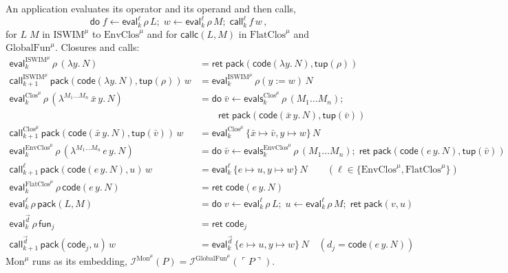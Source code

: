 \documentclass[10pt]{article}
\theoremstyle{acmplain}
\newcommand{\key}[1]{\mathsf{#1}}
\newcommand{\lam}[1]{\lambda #1.\,}
\newcommand{\clos}[2]{\lambda^{#1}\, #2.\,}
\newcommand{\funref}[1]{\key{fun}_{#1}}
\newcommand{\ext}[3]{#1(#2{:=}#3)}
\newcommand{\tupV}[1]{\key{tup}(#1)}
\newcommand{\codeV}[1]{\key{code}_{#1}}
\newcommand{\Ret}{\key{ret}\;}
\newcommand{\Do}{\key{do}\;}
\newcommand{\EV}[2]{\key{eval}^{#1}_{#2}}
\newcommand{\EVS}[2]{\key{evals}^{#1}_{#2}}
\newcommand{\CALL}[2]{\key{call}^{#1}_{#2}}
\newcommand{\Interp}[1]{\mathcal{I}^{#1}}
\newcommand{\Tcodetm}[3]{\key{code}(#1\,#2.\,#3)}  %
\newcommand{\Tpack}[2]{\key{pack}(#1, #2)}     %
\newcommand{\Tcallc}[2]{\key{callc}(#1, #2)}   %
\newcommand{\Tembed}[1]{\ulcorner #1 \urcorner}  %
\newcommand{\TcodeV}[1]{\key{code}(#1)}                   %
\newcommand{\Ml}[1]{\textrm{#1}^{\mu}}                  %
\begin{document}
An application evaluates its operator and its operand and then calls,
\[ \Do f \leftarrow \EV{\ell}{k}\,\rho\,L;\; w \leftarrow \EV{\ell}{k}\,\rho\,M;\; \CALL{\ell}{k}\,f\,w\,, \]
for $L\;M$ in $\Ml{ISWIM}$ to $\Ml{EnvClos}$ and for $\Tcallc{L}{M}$ in
$\Ml{FlatClos}$ and $\Ml{GlobalFun}$. Closures and calls:
\begin{align*}
  \EV{\Ml{ISWIM}}{k}\,\rho\,(\lam{y} N) &= \Ret \Tpack{\TcodeV{\lam{y} N}}{\tupV{\rho}} \\
  \CALL{\Ml{ISWIM}}{k+1}\,\Tpack{\TcodeV{\lam{y} N}}{\tupV{\rho}}\,w &= \EV{\Ml{ISWIM}}{k}\,\ext{\rho}{y}{w}\,N \\
  \EV{\Ml{Clos}}{k}\,\rho\,(\clos{M_1 \ldots M_n}{\bar{x}\, y} N) &=
    \Do \bar{v} \leftarrow \EVS{\Ml{Clos}}{k}\,\rho\,(M_1 \ldots M_n); \\
  &\qquad \Ret \Tpack{\TcodeV{\bar{x}\, y.\, N}}{\tupV{\bar{v}}} \\
  \CALL{\Ml{Clos}}{k+1}\,\Tpack{\TcodeV{\bar{x}\, y.\, N}}{\tupV{\bar{v}}}\,w &=
    \EV{\Ml{Clos}}{k}\,\{\bar{x} {\mapsto} \bar{v}, y {\mapsto} w\}\,N \\
  \EV{\Ml{EnvClos}}{k}\,\rho\,(\clos{M_1 \ldots M_n}{e\, y} N) &=
    \Do \bar{v} \leftarrow \EVS{\Ml{EnvClos}}{k}\,\rho\,(M_1 \ldots M_n);\; \Ret \Tpack{\TcodeV{e\, y.\, N}}{\tupV{\bar{v}}} \\
  \CALL{\ell}{k+1}\,\Tpack{\TcodeV{e\, y.\, N}}{u}\,w &=
    \EV{\ell}{k}\,\{e {\mapsto} u, y {\mapsto} w\}\,N \qquad (\ell \in \{\Ml{EnvClos}, \Ml{FlatClos}\}) \\
  \EV{\Ml{FlatClos}}{k}\,\rho\,\Tcodetm{e}{y}{N} &= \Ret \TcodeV{e\, y.\, N} \\
  \EV{\ell}{k}\,\rho\,\Tpack{L}{M} &=
    \Do v \leftarrow \EV{\ell}{k}\,\rho\,L;\; u \leftarrow \EV{\ell}{k}\,\rho\,M;\; \Ret \Tpack{v}{u} \\
  \EV{\vec{d}}{k}\,\rho\,\funref{j} &= \Ret \codeV{j} \\
  \CALL{\vec{d}}{k+1}\,\Tpack{\codeV{j}}{u}\,w &=
    \EV{\vec{d}}{k}\,\{e {\mapsto} u, y {\mapsto} w\}\,N
    \quad (d_j = \Tcodetm{e}{y}{N})
\end{align*}
$\Ml{Mon}$ runs as its embedding, $\Interp{\Ml{Mon}}(P) =
\Interp{\Ml{GlobalFun}}(\Tembed{P})$.
\end{document}
